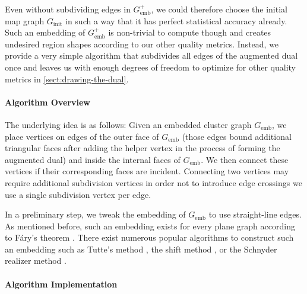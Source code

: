 Even without subdividing edges in $G_\text{emb}^+$, we could therefore choose the initial map graph $G_\text{init}$ in such a way that it has perfect statistical accuracy already. Such an embedding of $G_\text{emb}^+$ is non-trivial to compute though and creates undesired region shapes according to our other quality metrics. Instead, we provide a very simple algorithm that subdivides all edges of the augmented dual once and leaves us with enough degrees of freedom to optimize for other quality metrics in \cref{sect:drawing-the-dual}.



\paragraph{Algorithm Overview}

The underlying idea is as follows: Given an embedded cluster graph $G_\text{emb}$, we place vertices on edges of the outer face of $G_\text{emb}$ (those edges bound additional triangular faces after adding the helper vertex in the process of forming the augmented dual) and inside the internal faces of $G_\text{emb}$. We then connect these vertices if their corresponding faces are incident. Connecting two vertices may require additional subdivision vertices in order not to introduce edge crossings \emdash{} we use a single subdivision vertex per edge.

In a preliminary step, we tweak the embedding of $G_\text{emb}$ to use straight-line edges. As mentioned before, such an embedding exists for every plane graph according to Fáry's theorem \cite{fary1948straight}. There exist numerous popular algorithms to construct such an embedding such as Tutte's method \cite{tutte1963draw}, the shift method \cite{fraysseix1990draw}, or the Schnyder realizer method \cite{schnyder1990embedding}. 



\clearpage
\paragraph{Algorithm Implementation}

